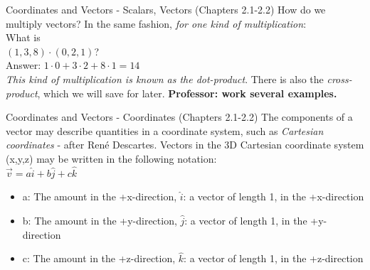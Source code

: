\documentclass{beamer}
\begin{document}
\begin{frame}{Coordinates and Vectors - Scalars, Vectors (Chapters 2.1-2.2)}
How do we multiply vectors? In the same fashion, \textit{for one kind of multiplication}:\\
\vspace{0.5cm}
What is\\
$(1,3,8)\cdot (0,2,1)$? \\
Answer: $1\cdot 0 + 3 \cdot 2 + 8 \cdot 1 = 14$ \\
\vspace{0.5cm}
\textit{This kind of multiplication is known as the dot-product}.  There is also the \textit{cross-product}, which we will save for later. \textbf{Professor: work several examples.}
\end{frame}

\begin{frame}{Coordinates and Vectors - Coordinates (Chapters 2.1-2.2)}
\small
The components of a vector may describe quantities in a \alert{coordinate system}, such as \textit{Cartesian coordinates} - after Ren\'e Descartes.  Vectors in the 3D Cartesian coordinate system (x,y,z) may be written in the following notation:
\\
\vspace{0.2cm}
$\boxed{\vec{v} = a\hat{i} + b\hat{j} + c\hat{k}}$
\\
\begin{itemize}
\item a: The amount in the +x-direction, $\hat{i}$: a vector of length 1, in the +x-direction
\item b: The amount in the +y-direction, $\hat{j}$: a vector of length 1, in the +y-direction
\item c: The amount in the +z-direction, $\hat{k}$: a vector of length 1, in the +z-direction
\end{itemize}
\end{frame}
\end{document}
